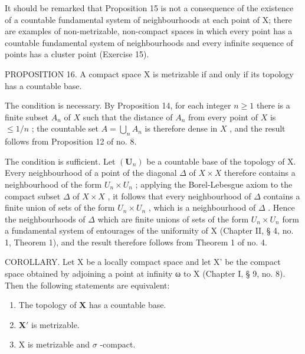 It should be remarked that Proposition 15 is not a consequence of the existence of a countable fundamental system of neighbourhoods at each point of X; there are examples of non-metrizable, non-compact spaces in which every point has a countable fundamental system of neighbourhoods and every infinite sequence of points has a cluster point (Exercise 15).

PROPOSITION 16. A compact space X is metrizable if and only if its topology has a countable base.

The condition is necessary. By Proposition 14, for each integer \(n \geqslant 1\) there is a finite subset \(A_n\) of \(X\) such that the distance of \(A_n\) from every point of \(X\) is \(\leqslant 1/n\) ; the countable set \(A = \bigcup_{n} A_n\) is therefore dense in \(X\) , and the result follows from Proposition 12 of no. 8.

The condition is sufficient. Let \((\mathbf{U}_{n})\) be a countable base of the topology of X. Every neighbourhood of a point of the diagonal \(\Delta\) of \(X \times X\) therefore contains a neighbourhood of the form \(U_{n} \times U_{n}\) ; applying the Borel-Lebesgue axiom to the compact subset \(\Delta\) of \(X \times X\) , it follows that every neighbourhood of \(\Delta\) contains a finite union of sets of the form \(U_{n} \times U_{n}\) , which is a neighbourhood of \(\Delta\) . Hence the neighbourhoods of \(\Delta\) which are finite unions of sets of the form \(U_{n} \times U_{n}\) form a fundamental system of entourages of the uniformity of X (Chapter II, § 4, no. 1, Theorem 1), and the result therefore follows from Theorem 1 of no. 4.

COROLLARY. Let X be a locally compact space and let X' be the compact space obtained by adjoining a point at infinity ω to X (Chapter I, § 9, no. 8). Then the following statements are equivalent:

\begin{enumerate}
\def\labelenumi{\alph{enumi})}
\item
  The topology of \(\mathbf{X}\) has a countable base.
\item
  \(\mathbf{X}'\) is metrizable.
\item
  X is metrizable and \(\sigma\) -compact.
\end{enumerate}

